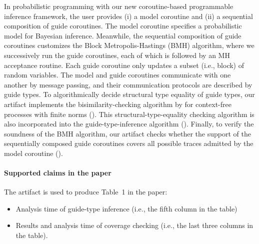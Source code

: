 In probabilistic programming with our new coroutine-based programmable inference
framework, the user provides (i) a model coroutine and (ii) a sequential
composition of guide coroutines.
%
The model coroutine specifies a probabilistic model for Bayesian inference.
%
Meanwhile, the sequential composition of guide coroutines customizes the Block
Metropolis-Hastings (BMH) algorithm, where we successively run the guide
coroutines, each of which is followed by an MH acceptance routine.
%
Each guide coroutine only updates a subset (i.e., block) of random variables.
%
The model and guide coroutines communicate with one another by message passing,
and their communication protocols are described by guide types.
%
To algorithmically decide structural type equality of guide types, our artifact
implements the bisimilarity-checking algorithm by \citeauthor{Hirshfeld1994} for
context-free processes with finite norms ().
%
This structural-type-equality checking algorithm is also incorporated into the
guide-type-inference algorithm ().
%
Finally, to verify the soundness of the BMH algorithm, our artifact checks
whether the support of the sequentially composed guide coroutines covers all
possible traces admitted by the model coroutine ().

\paragraph{Supported claims in the paper}

The artifact is used to produce Table~1 in the paper:
\begin{itemize}
  \item Analysis time of guide-type inference (i.e., the fifth column in the
        table)
  \item Results and analysis time of coverage checking (i.e., the last three
        columns in the table).
\end{itemize}
